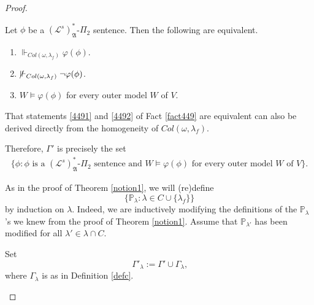 \documentclass[12pt]{article}
\numberwithin{equation}{section}
\begin{document}
\begin{proof}
\begin{fact}\label{fact449}
Let $\phi$ be a $(\mathcal{L}^s)^*_{\mathfrak{A}}$-$\Pi_2$ sentence. Then the following are equivalent.
\begin{enumerate}[label=(\arabic*)$_{\phi}$]
    \item\label{4491} $\Vdash_{Col(\omega, \lambda_f)} \varphi(\phi)$.
    \item\label{4492} $\mspace{-3mu}\not \mspace{3mu}\Vdash_{Col(\omega, \lambda_f)} \neg \varphi(\phi)$.
    \item $W \models \varphi(\phi)$ for every outer model $W$ of $V$.
\end{enumerate}
\end{fact}

\begin{rem}
That statements \ref{4491} and \ref{4492} of Fact \ref{fact449} are equivalent can also be derived directly from the homogeneity of $Col(\omega, \lambda_f)$.
\end{rem}

Therefore, $\Gamma'$ is precisely the set 
\begin{align*}
    \{\phi : \phi \text{ is a } (\mathcal{L}^s)^*_{\mathfrak{A}}\text{-}\Pi_2 \text{ sentence and } W \models \varphi(\phi) \text{ for every outer model } W \text{ of } V\} \text{.}
\end{align*}

As in the proof of Theorem \ref{notion1}, we will (re)define $$\{\mathbb{P}_{\lambda} : \lambda \in C \cup \{\lambda_f\}\}$$ by induction on $\lambda$. Indeed, we are inductively modifying the definitions of the $\mathbb{P}_{\lambda}$'s we knew from the proof of Theorem \ref{notion1}. Assume that $\mathbb{P}_{\lambda'}$ has been modified for all $\lambda' \in \lambda \cap C$. 

\begin{defi}\label{def447}
Set
\begin{equation*}
    \Gamma'_{\lambda} := \Gamma' \cup \Gamma_{\lambda} \text{,}
\end{equation*}
where $\Gamma_{\lambda}$ is as in Definition \ref{defc}. 
\end{defi}


\end{proof}
\end{document}
